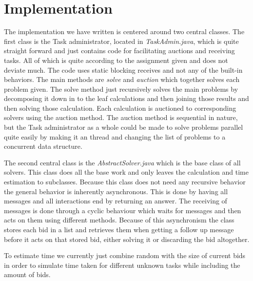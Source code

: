 \section{Implementation}\label{sec:implementation}
The implementation we have written is centered around two central classes. The
first class is the Task administrator, located in \textit{TaskAdmin.java}, which
is quite straight forward and just contains code for facilitating auctions and
receiving tasks. All of which is quite according to the assignment given and
does not deviate much. The code uses static blocking receives and not any of the
built-in behaviors. The main methods are \textit{solve} and \textit{auction}
which together solves each problem given. The solve method just recursively
solves the main problems by decomposing it down in to the leaf calculations and
then joining those results and then solving those calculation. Each calculation
is auctioned to corresponding solvers using the auction method. The
auction method is sequential in nature, but the Task administrator as a whole
could be made to solve problems parallel quite easily by making it an thread and
changing the list of problems to a concurrent data structure.

The second central class is the \textit{AbstractSolver.java} which is the base
class of all solvers. This class does all the base work and only leaves the
calculation and time estimation to subclasses. Because this class does not need
any recursive behavior the general behavior is inherently asynchronous. This is
done by having all messages and all interactions end by returning an answer. The
receiving of messages is done through a cyclic behaviour which waits for
messages and then acts on them using different methods. Because of this
asynchronism the class stores each bid in a list and retrieves them when getting
a follow up message before it acts on that stored bid, either solving it or
discarding the bid altogether.

To estimate time we currently just combine random with the size of current bids
in order to simulate time taken for different unknown tasks while including the
amount of bids.
